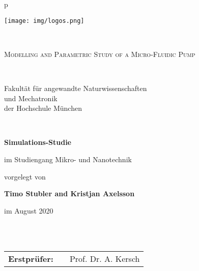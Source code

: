 \begin{center}
\begin{tabular}{p{\textwidth}}


\begin{center}
\texttt{[image: img/logos.png]}
\end{center}


\\

\begin{center}
\LARGE{\textsc{
Modelling and Parametric Study of a Micro-Fluidic Pump\\
}}
\end{center}

\\


\begin{center}
\large{Fakultät für angewandte Naturwissenschaften \\
und Mechatronik \\
der Hochschule München}
\end{center}

\\

\begin{center}
\textbf{\Large{Simulations-Studie}}
\end{center}


\begin{center}
im Studiengang Mikro- und Nanotechnik
\end{center}


\begin{center}
vorgelegt von
\end{center}

\begin{center}
\large{\textbf{Timo Stubler and Kristjan Axelsson}} \\
\end{center}

\begin{center}
\large{im August 2020}
\end{center}

\\

\\

\begin{center}
\begin{tabular}{lll}
\textbf{Erstprüfer:} & & Prof. Dr. A. Kersch\\
\end{tabular}
\end{center}

\end{tabular}
\end{center}